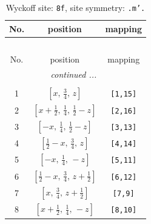 \documentclass[fleqn,8pt]{jsarticle}
\begin{document}
\begin{longtable}{ccc}
\caption{Wyckoff site: {\tt 8f}, site symmetry: {\tt .m'.}}
 \\
 \hline \hline
No. & position & mapping \\ \hline \endfirsthead

\multicolumn{2}{l}{\tablename\ \thetable{}} \\
 \hline \hline
No. & position & mapping \\ \hline \endhead

 \hline \hline
\multicolumn{2}{r}{\footnotesize\it continued ...} \\ \endfoot

 \hline \hline
\multicolumn{2}{r}{} \\ \endlastfoot

1 & $\left[ x,\, \frac{3}{4},\, z \right]$ & {\tt [1,15]} \\ \hline
2 & $\left[ x + \frac{1}{2},\, \frac{1}{4},\, \frac{1}{2} - z \right]$ & {\tt [2,16]} \\ \hline
3 & $\left[ - x,\, \frac{1}{4},\, \frac{1}{2} - z \right]$ & {\tt [3,13]} \\ \hline
4 & $\left[ \frac{1}{2} - x,\, \frac{3}{4},\, z \right]$ & {\tt [4,14]} \\ \hline
5 & $\left[ - x,\, \frac{1}{4},\, - z \right]$ & {\tt [5,11]} \\ \hline
6 & $\left[ \frac{1}{2} - x,\, \frac{3}{4},\, z + \frac{1}{2} \right]$ & {\tt [6,12]} \\ \hline
7 & $\left[ x,\, \frac{3}{4},\, z + \frac{1}{2} \right]$ & {\tt [7,9]} \\ \hline
8 & $\left[ x + \frac{1}{2},\, \frac{1}{4},\, - z \right]$ & {\tt [8,10]} \\
\end{longtable}
\renewcommand{\arraystretch}{1.2}
\end{document}
